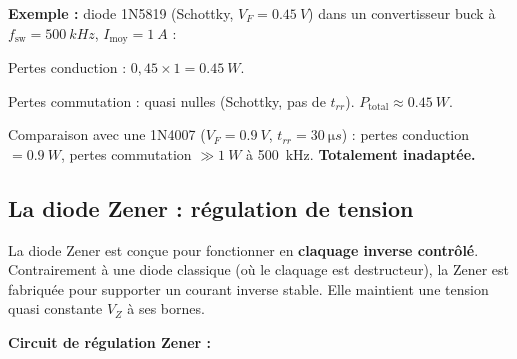 \documentclass[12pt,a4paper,twoside]{book}
\begin{document}
\begin{pratique}
\textbf{Exemple :} diode 1N5819 (Schottky, $V_F = \SI{0.45}{V}$) dans un convertisseur buck à $f_{\text{sw}} = \SI{500}{kHz}$, $I_{\text{moy}} = \SI{1}{A}$ :

Pertes conduction : $0{,}45 \times 1 = \SI{0.45}{W}$.

Pertes commutation : quasi nulles (Schottky, pas de $t_{rr}$). $P_{\text{total}} \approx \SI{0.45}{W}$.

Comparaison avec une 1N4007 ($V_F = \SI{0.9}{V}$, $t_{rr} = \SI{30}{\micro s}$) : pertes conduction $= \SI{0.9}{W}$, pertes commutation $\gg \SI{1}{W}$ à \SI{500}{kHz}. \textbf{Totalement inadaptée.}
\end{pratique}

\subsection{La diode Zener : régulation de tension}

La diode Zener est conçue pour fonctionner en \textbf{claquage inverse contrôlé}. Contrairement à une diode classique (où le claquage est destructeur), la Zener est fabriquée pour supporter un courant inverse stable. Elle maintient une tension quasi constante $V_Z$ à ses bornes.

\textbf{Circuit de régulation Zener :}

\begin{center}
\end{center}
\end{document}
